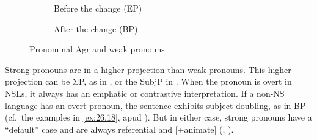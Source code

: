\documentclass[output=paper]{langsci/langscibook}
\begin{document}
\begin{figure}
\begin{subfigure}[b]{.5\linewidth}\centering%
\caption{Before the change (\gls{EP})}
\end{subfigure}\begin{subfigure}[b]{.5\linewidth}\centering%
\caption{After the change (\gls{BP})}
    \end{subfigure}
\caption{Pronominal Agr and weak pronouns\label{fig:ex:26.fig3}}
\end{figure}

Strong pronouns are in a higher projection than weak pronouns. This higher
projection can be ΣP, as in \citet{Martins1994}, or the SubjP in
\citet{Cardinaletti:2004a}. When the pronoun is overt in \gls{NSL}s, it always
has an emphatic or contrastive interpretation. If a non-NS language has an
overt pronoun, the sentence exhibits subject doubling, as in
\gls{BP} (cf.\ the examples in \eqref{ex:26.18},
apud \citealt{Kato2012}). But in either case, strong pronouns have a “default”
case and are always referential and  [+animate] (\citealt{Kato1999},
\citealt{Schutze2001}).
\end{document}
